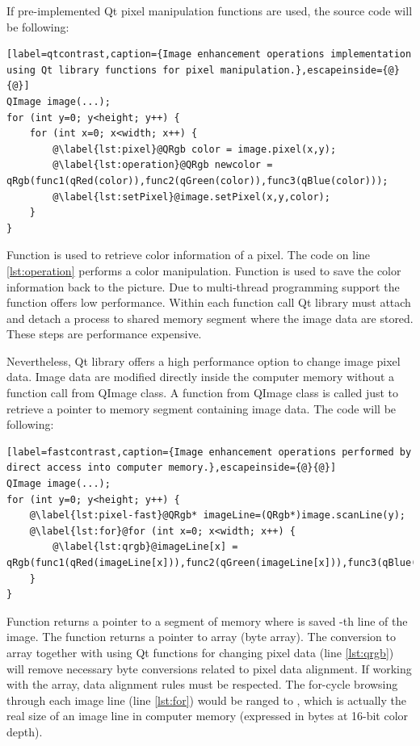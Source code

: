 If pre-implemented Qt pixel manipulation functions are used, the source code will be following:

\begin{lstlisting}[label=qtcontrast,caption={Image enhancement operations implementation using Qt library functions for pixel manipulation.},escapeinside={@}{@}]
QImage image(...);
for (int y=0; y<height; y++) {
	for (int x=0; x<width; x++) {
		@\label{lst:pixel}@QRgb color = image.pixel(x,y);
		@\label{lst:operation}@QRgb newcolor = qRgb(func1(qRed(color)),func2(qGreen(color)),func3(qBlue(color)));
		@\label{lst:setPixel}@image.setPixel(x,y,color);
	}
}
\end{lstlisting}

Function  is used to retrieve color information of a pixel. The code on line \ref{lst:operation} performs a color manipulation. Function  is used to save the color information back to the picture. Due to multi-thread programming support the  function offers low performance. Within each function call Qt library must attach and detach a process to shared memory segment where the image data are stored. These steps are performance expensive.

Nevertheless, Qt library offers a high performance option to change image pixel data. Image data are modified directly inside the computer memory without a function call from QImage class. A function from QImage class is called just to retrieve a pointer to memory segment containing image data. The code will be following:

\begin{lstlisting}[label=fastcontrast,caption={Image enhancement operations performed by direct access into computer memory.},escapeinside={@}{@}]
QImage image(...);
for (int y=0; y<height; y++) {
	@\label{lst:pixel-fast}@QRgb* imageLine=(QRgb*)image.scanLine(y);
	@\label{lst:for}@for (int x=0; x<width; x++) {
		@\label{lst:qrgb}@imageLine[x] = qRgb(func1(qRed(imageLine[x])),func2(qGreen(imageLine[x])),func3(qBlue(imageLine[x])));
	}
}
\end{lstlisting}

Function  returns a pointer to a segment of memory where is saved -th line of the image. The  function returns a pointer to  array (byte array). The conversion to  array together with using Qt functions for changing pixel data (line \ref{lst:qrgb}) will remove necessary byte conversions related to pixel data alignment. If working with the  array, data alignment rules must be respected. The for-cycle browsing through each image line (line \ref{lst:for}) would be ranged to , which is actually the real size of an image line in computer memory (expressed in bytes at 16-bit color depth).


